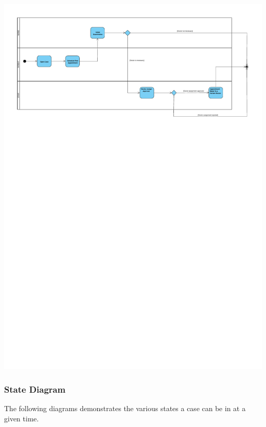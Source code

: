 \documentclass[a4paper, 12pt, titlepage]{article}
\begin{document}
  \includegraphics[width=\linewidth]{activity_diag_appointment}

  \subsubsection{State Diagram}

  The following diagrams demonstrates the various states a case can be in at a given time.
  
\end{document}
